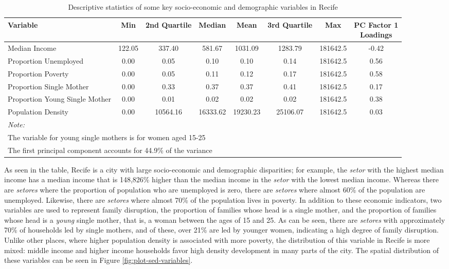 \documentclass[smallextended]{svjour3}       %
\begin{document}
\begin{table}

\caption{\label{tab:table-sed-descriptive-statistics}\label{tab:sed-descriptive-statistics}Descriptive statistics of some key socio-economic and demographic variables in Recife}
\centering
\begin{tabular}[t]{lccccccc}
\toprule
Variable & Min & 2nd Quartile & Median & Mean & 3rd Quartile & Max & \makecell[l]{PC Factor 1\\ Loadings}\\
\midrule
Median Income & 122.05 & 337.40 & 581.67 & 1031.09 & 1283.79 & 181642.5 & -0.42\\
Proportion Unemployed & 0.00 & 0.05 & 0.10 & 0.10 & 0.14 & 181642.5 & 0.56\\
Proportion Poverty & 0.00 & 0.05 & 0.11 & 0.12 & 0.17 & 181642.5 & 0.58\\
Proportion Single Mother & 0.00 & 0.33 & 0.37 & 0.37 & 0.41 & 181642.5 & 0.17\\
Proportion Young Single Mother & 0.00 & 0.01 & 0.02 & 0.02 & 0.02 & 181642.5 & 0.38\\
\addlinespace
Population Density & 0.00 & 10564.16 & 16333.62 & 19230.23 & 25106.07 & 181642.5 & 0.03\\
\bottomrule
\multicolumn{8}{l}{\textit{Note: }}\\
\multicolumn{8}{l}{The variable for young single mothers is for women aged 15-25}\\
\multicolumn{8}{l}{The first principal component accounts for 44.9\% of the variance}\\
\end{tabular}
\end{table}

As seen in the table, Recife is a city with large socio-economic and
demographic disparities; for example, the \emph{setor} with the highest
median income has a median income that is 148,826\% higher than the
median income in the \emph{setor} with the lowest median income. Whereas
there are \emph{setores} where the proportion of population who are
unemployed is zero, there are \emph{setores} where almost 60\% of the
population are unemployed. Likewise, there are \emph{setores} where
almost 70\% of the population lives in poverty. In addition to these
economic indicators, two variables are used to represent family
disruption, the proportion of families whose head is a single mother,
and the proportion of families whose head is a \emph{young} single
mother, that is, a woman between the ages of 15 and 25. As can be seen,
there are \emph{setores} with approximately 70\% of households led by
single mothers, and of these, over 21\% are led by younger women,
indicating a high degree of family disruption. Unlike other places,
where higher population density is associated with more poverty, the
distribution of this variable in Recife is more mixed: middle income and
higher income households favor high density development in many parts of
the city. The spatial distribution of these variables can be seen in
Figure \ref{fig:plot-sed-variables}.
\end{document}
